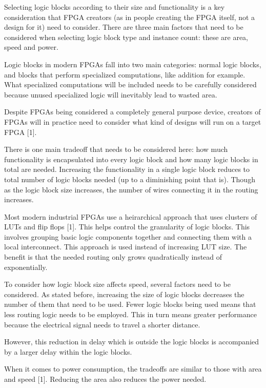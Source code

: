 \documentclass{article}
\begin{document}
    Selecting logic blocks according to their size and functionality is a key consideration
    that FPGA creators (as in people creating the FPGA itself, not a design for it) need
    to consider. There are three main factors that need to be considered when selecting logic
    block type and instance count: these are area, speed and power.

    Logic blocks in modern FPGAs fall into two main categories: normal logic blocks,
    and blocks that perform specialized computations, like addition for example.
    What specialized computations will be included needs to be carefully considered
    because unused specialized logic will inevitably lead to wasted area.

    Despite FPGAs being considered a completely general purpose device,
    creators of FPGAs will in practice need to consider what kind of designs
    will run on a target FPGA [1].

    There is one main tradeoff that needs to be considered here:
    how much functionality is encapsulated into every logic block and how many
    logic blocks in total are needed.
    Increasing the functionality in a single logic block reduces to total
    number of logic blocks needed (up to a diminishing point that is).
    Though as the logic block size increases, the number of wires connecting
    it in the routing increases.

    Most modern industrial FPGAs use a heirarchical approach that uses
    clusters of LUTs and flip flops [1]. This helps control the granularity
    of logic blocks.
    This involves grouping basic logic components together and connecting
    them with a local interconnect.
    This approach is used instead of increasing LUT size.
    The benefit is that the needed routing only grows quadratically instead
    of exponentially.

    To consider how logic block size affects speed, several factors need to be considered.
    As stated before, increasing the size of logic blocks decreases the number of them
    that need to be used. Fewer logic blocks being used means that less routing
    logic needs to be employed. This in turn means greater performance
    because the electrical signal needs to travel a shorter distance.

    However, this reduction in delay which is outside the logic blocks is
    accompanied by a larger delay within the logic blocks.

    When it comes to power consumption, the tradeoffs are similar to those
    with area and speed [1]. Reducing the area also reduces the power needed.
\end{document}
